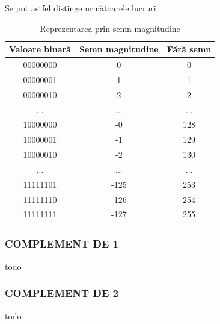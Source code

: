 \documentclass[12pt]{article}
\begin{document}
Se pot astfel distinge următoarele lucruri:

\newpage
\begin{table}[h]
\centering
\caption{Reprezentarea prin semn-magnitudine }
\label{Tabela:4}
\begin{tabular}{ ||c|c|c|| }
 \hline
 Valoare binară & Semn magnitudine &  Fără semn\\ 
 \hline  \hline
 00000000 & 0 & 0\\
 \hline
 00000001 & 1  & 1\\
 \hline
 00000010 &  2 & 2 \\
 \hline
  ... &  ... & ... \\
 \hline
 10000000 & -0 & 128 \\
 \hline
 10000001 & -1 & 129 \\
 \hline
 10000010 & -2 & 130 \\
 \hline
   ... &  ... & ... \\
 \hline
  11111101 & -125 & 253 \\
 \hline
 11111110 & -126 & 254 \\
 \hline
 11111111 & -127 & 255 \\
 \hline
\end{tabular}
\end{table}

\subsubsection{COMPLEMENT DE 1}
todo
\subsubsection{COMPLEMENT DE 2}
todo
\end{document}

